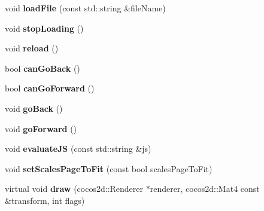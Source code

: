 \begin{DoxyCompactItemize}
void {\bfseries load\+File} (const std\+::string \&file\+Name)
\item 
\mbox{\label{classcocos2d_1_1experimental_1_1ui_1_1WebViewImpl_a4ce728b37a704b2aef4e60b64a36a12b}} 
void {\bfseries stop\+Loading} ()
\item 
\mbox{\label{classcocos2d_1_1experimental_1_1ui_1_1WebViewImpl_a2b3e5a5a31be731ba7f02937cf14819f}} 
void {\bfseries reload} ()
\item 
\mbox{\label{classcocos2d_1_1experimental_1_1ui_1_1WebViewImpl_a884709062c53cf3fc54b449cbe6745f1}} 
bool {\bfseries can\+Go\+Back} ()
\item 
\mbox{\label{classcocos2d_1_1experimental_1_1ui_1_1WebViewImpl_a4ee5cd284608bbfc6dfed6d6b6133456}} 
bool {\bfseries can\+Go\+Forward} ()
\item 
\mbox{\label{classcocos2d_1_1experimental_1_1ui_1_1WebViewImpl_a619d93935a4678582584cca81e1a74db}} 
void {\bfseries go\+Back} ()
\item 
\mbox{\label{classcocos2d_1_1experimental_1_1ui_1_1WebViewImpl_a7e002a0b70d64b4ef8d43d94df66b667}} 
void {\bfseries go\+Forward} ()
\item 
\mbox{\label{classcocos2d_1_1experimental_1_1ui_1_1WebViewImpl_aa6f656b1a8a513817e73edca65a21093}} 
void {\bfseries evaluate\+JS} (const std\+::string \&js)
\item 
\mbox{\label{classcocos2d_1_1experimental_1_1ui_1_1WebViewImpl_a9f05614a83cc4251a7f87bd4d9f4e51c}} 
void {\bfseries set\+Scales\+Page\+To\+Fit} (const bool scales\+Page\+To\+Fit)
\item 
\mbox{\label{classcocos2d_1_1experimental_1_1ui_1_1WebViewImpl_a32b85b662ef7ac2b57fd328c97e51bc8}} 
virtual void {\bfseries draw} (cocos2d\+::\+Renderer $\ast$renderer, cocos2d\+::\+Mat4 const \&transform, int flags)

\end{DoxyCompactItemize}
